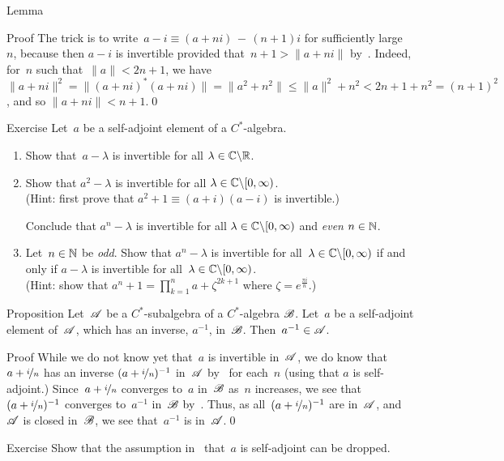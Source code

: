 \documentclass[a]{subfiles}
\begin{document}
\begin{parsec}
\begin{point}{Lemma}
\begin{point}{Proof}
The trick
is to 
write~$a-i\equiv (a+ni)\,-\,(n+1)i$
for sufficiently large~$n$,
because  
then
$a-i$
is invertible provided that~$n+1 > \|a+ni\|$
by~.
Indeed, for~$n$ such that~$\|a\|<2n+1$,
we have $\|a+ni\|^2 = \|(a+ni)^*(a+ni)\|
= \|a^2+n^2\|
\leq \|a\|^2+n^2 < 2n+1+n^2 = (n+1)^2$,
and so $\|a+ni\| < n+1$.\qed
\end{point}
\end{point}
\begin{point}{Exercise}%
Let~$a$ be a self-adjoint element of a $C^*$-algebra.
\begin{enumerate}
\item
Show that~$a-\lambda$ is invertible for all $\lambda\in \mathbb{C}\backslash \mathbb{R}$.
\item
Show that $a^2-\lambda$ is invertible for all 
$\lambda\in \mathbb{C}\backslash[0,\infty)$.\\
(Hint: first prove that
 $a^2+1 \equiv (a+i)(a-i)$ is invertible.)

Conclude that $a^n-\lambda$ is invertible for all 
$\lambda\in\mathbb{C}\backslash[0,\infty)$ and \emph{even} $n\in\mathbb{N}$.
\item
Let~$n\in \mathbb{N}$ be \emph{odd}.
Show that $a^n-\lambda$ is invertible
for all~$\lambda\in \mathbb{C}\backslash[0,\infty)$
if and only if $a-\lambda$ is invertible
for all~$\lambda\in \mathbb{C}\backslash[0,\infty)$.\\
(Hint: show that
$a^n+1= \prod_{k=1}^n a+\zeta^{2k+1}$
where $\zeta=e^{\frac{\pi i}{n}}$.)
\end{enumerate}
\end{point}
\begin{point}{Proposition}%
Let~$\mathscr{A}$ be a $C^*$-subalgebra
of a $C^*$-algebra $\mathscr{B}$.
Let~$a$ be a self-adjoint element of~$\mathscr{A}$,
which has an inverse, $a^{-1}$, in~$\mathscr{B}$.
Then~$a^{-1}\in\mathscr{A}$.
\begin{point}{Proof}%
While we do not know yet that~$a$ is invertible in~$\mathscr{A}$,
we do know that~$a+\nicefrac{i}{n}$ 
has an inverse $(a+\nicefrac{i}{n})^{-1}$ in~$\mathscr{A}$
by~
for each~$n$
(using that $a$ is self-adjoint.)
Since~$a+\nicefrac{i}{n}$ converges to~$a$ in~$\mathscr{B}$ as~$n$ increases,
we see that $(a+\nicefrac{i}{n})^{-1}$ converges to~$a^{-1}$
in~$\mathscr{B}$ by~.
Thus, as all~$(a+\nicefrac{i}{n})^{-1}$ are in~$\mathscr{A}$,
and~$\mathscr{A}$ is closed in~$\mathscr{B}$,
we see that~$a^{-1}$ is in~$\mathscr{A}$.\qed
\end{point}
\end{point}
\begin{point}{Exercise}%
	Show that the assumption in~ 
	that~$a$ is self-adjoint
can be dropped. 


\end{point}
\end{parsec}
\end{document}
